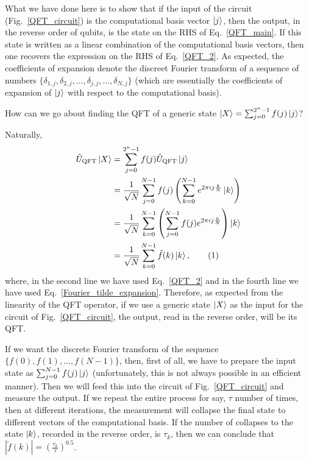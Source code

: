 \documentclass[12pt,oneside]{book}
\newcommand\numberthis{\addtocounter{equation}{1}\tag{\theequation}}
\begin{document}
What we have done here is to show that if the input of the circuit (Fig.~\ref{QFT_circuit}) is the computational basis vector $\ket{j}$, then the output, in the reverse order of qubits, is the state on the RHS of Eq.~\ref{QFT_main}. If this state is written as a linear combination of the computational basis vectors, then one recovers the expression on the RHS of Eq.~\ref{QFT_2}. As expected, the coefficients of expansion denote the discreet Fourier transform of a sequence of numbers $\{\delta_{1,j}, \delta_{2,j}, \hdots, \delta_{j,j},\hdots,\delta_{N,j}\}$ (which are essentially the coefficients of expansion of $\ket{j}$ with respect to the computational basis).

How can we go about finding the QFT of a generic state $\ket{X}=\sum_{j=0}^{2^n-1} f(j)\ket{j}$? 

Naturally,
\begin{align*}\label{QFT_generic}
    \hat{U}_{\mathrm{QFT}}\ket{X} &{}= \sum_{j=0}^{2^n-1} f(j) \hat{U}_{\mathrm{QFT}} \ket{j}\\
    &{}=\frac{1}{\sqrt{N}} \sum_{j=0}^{N-1} f(j) \left(\sum_{k=0}^{N-1}e^{2\pi ij\frac{k}{N}}\ket{k}\right)\\
    &{} = \frac{1}{\sqrt{N}} \sum_{k=0}^{N-1} \left( \sum_{j=0}^{N-1} f(j) e^{2\pi ij\frac{k}{N}}\right) \ket{k}\\
    &{} = \frac{1}{\sqrt{N}} \sum_{k=0}^{N-1} \tilde{f}(k)\ket{k},\numberthis
\end{align*}
where, in the second line we have used Eq.~\ref{QFT_2} and in the fourth line we have used Eq.~\ref{Fourier_tilde_expansion}. Therefore, as expected from the linearity of the QFT operator, if we use a generic state $\ket{X}$ as the input for the circuit of Fig.~\ref{QFT_circuit}, the output, read in the reverse order, will be its QFT.

If we want the discrete Fourier transform of the sequence $\{f(0),f(1),\hdots,f(N-1)\}$, then, first of all, we have to prepare the input state as $\sum_{j=0}^{N-1}f(j)\ket{j}$ (unfortunately, this is not always possible in an efficient manner). Then we will feed this into the circuit of Fig.~\ref{QFT_circuit} and measure the output. If we repeat the entire process for say, $\tau$ number of times, then at different iterations, the measurement will collapse the final state to different vectors of the computational basis.
%
If the number of collapses to the state $\ket{k}$, recorded in the reverse order, is $\tau_k$, then we can conclude that $|\tilde{f}(k)|=\left(\frac{\tau_k}{\tau}\right)^{0.5}$.
\end{document}

